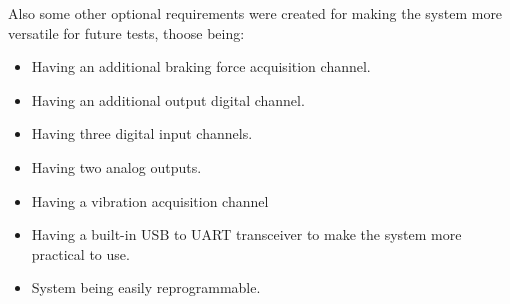 	Also some other optional requirements were created for making the system more versatile for future tests, thoose being:

	\begin{itemize}
		\item Having an additional braking force acquisition channel.
		\item Having an additional output digital channel.
		\item Having three digital input channels.
		\item Having two analog outputs.
		\item Having a vibration acquisition channel
		\item Having a built-in USB to UART transceiver to make the system more practical to use.
		\item System being easily reprogrammable.
	\end{itemize}

\begin{comment}
\section{Software Requirements}\label{sec:software-requirements}
	
	\begin{enumerate}
		\item System must have a sampling rate of 50 ms.\label{itm:soft-req-1}
		\item System must be able to monitor six analog channels at once.\label{itm:soft-req-2}
		\item System must be able to control the digital outputs and one analog output during acquisition without loosing the real time constrain.\label{itm:soft-req-3}
		\item The data acquired does not need to be shown to user in real time.\label{itm:soft-req-4}
		\item The software layer must be able to record the data of the test.\label{itm:soft-req-5}
		\item The software highest layer must have a friendly GUI, advanced electronic and simple programmable knowledge cannot be a requirement to operate the software.\label{itm:soft-req-6}
		\item Calibration of the sensors data must be easy to modify on the software.\label{itm:soft-req-7}
		\item Software must be multiplatform.\label{itm:soft-req-8}
	\end{enumerate}
\end{comment}